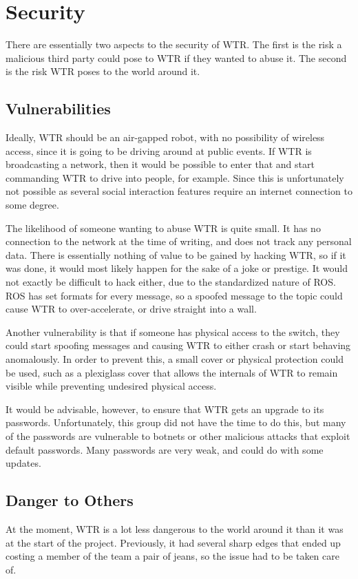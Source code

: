 \section{Security}
There are essentially two aspects to the security of WTR.
The first is the risk a malicious third party could pose to WTR if they wanted to abuse it.
The second is the risk WTR poses to the world around it.

\subsection{Vulnerabilities}
Ideally, WTR should be an air-gapped robot, with no possibility of wireless access, since it is going to be driving around at public events.
If WTR is broadcasting a network, then it would be possible to enter that and start commanding WTR to drive into people, for example.
Since this is unfortunately not possible as several social interaction features require an internet connection to some degree.

The likelihood of someone wanting to abuse WTR is quite small.
It has no connection to the network at the time of writing, and does not track any personal data.
There is essentially nothing of value to be gained by hacking WTR, so if it was done, it would most likely happen for the sake of a joke or prestige.
It would not exactly be difficult to hack either, due to the standardized nature of ROS.
ROS has set formats for every message, so a spoofed message to the  topic could cause WTR to over-accelerate, or drive straight into a wall.

Another vulnerability is that if someone has physical access to the switch, they could start spoofing messages and causing WTR to either crash or start behaving anomalously.
In order to prevent this, a small cover or physical protection could be used, such as a plexiglass cover that allows the internals of WTR to remain visible while preventing undesired physical access.

It would be advisable, however, to ensure that WTR gets an upgrade to its passwords.
Unfortunately, this group did not have the time to do this, but many of the passwords are vulnerable to botnets or other malicious attacks that exploit default passwords.
Many passwords are very weak, and could do with some updates.

\subsection{Danger to Others}
At the moment, WTR is a lot less dangerous to the world around it than it was at the start of the project.
Previously, it had several sharp edges that ended up costing a member of the team a pair of jeans, so the issue had to be taken care of.


